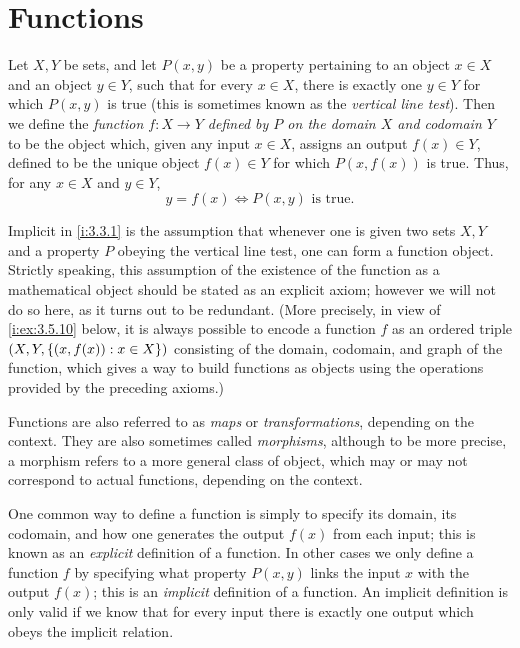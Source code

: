 \section{Functions}\label{i:sec:3.3}

\begin{defn}[Functions]\label{i:3.3.1}
  Let \(X, Y\) be sets, and let \(P(x, y)\) be a property pertaining to an object \(x \in X\) and an object \(y \in Y\), such that for every \(x \in X\), there is exactly one \(y \in Y\) for which \(P(x, y)\) is true (this is sometimes known as the \emph{vertical line test}).
  Then we define the \emph{function \(f : X \to Y\) defined by \(P\) on the domain \(X\) and codomain \(Y\)} to be the object which, given any input \(x \in X\), assigns an output \(f(x) \in Y\), defined to be the unique object \(f(x) \in Y\) for which \(P(x, f(x))\) is true.
  Thus, for any \(x \in X\) and \(y \in Y\),
  \[
    y = f(x) \iff P(x, y) \text{ is true}.
  \]
\end{defn}

\begin{note}
  Implicit in \cref{i:3.3.1} is the assumption that whenever one is given two sets \(X, Y\) and a property \(P\) obeying the vertical line test, one can form a function object.
  Strictly speaking, this assumption of the existence of the function as a mathematical object should be stated as an explicit axiom;
  however we will not do so here, as it turns out to be redundant.
  (More precisely, in view of \cref{i:ex:3.5.10} below, it is always possible to encode a function \(f\) as an ordered triple \((X, Y, \left\lbrace(x, f(x)) : x \in X\right\rbrace)\) consisting of the domain, codomain, and graph of the function, which gives a way to build functions as objects using the operations provided by the preceding axioms.)
\end{note}

\begin{note}
  Functions are also referred to as \emph{maps} or \emph{transformations}, depending on the context.
  They are also sometimes called \emph{morphisms}, although to be more precise, a morphism refers to a more general class of object, which may or may not correspond to actual functions, depending on the context.
\end{note}

\begin{note}
  One common way to define a function is simply to specify its domain, its codomain, and how one generates the output \(f(x)\) from each input;
  this is known as an \emph{explicit} definition of a function.
  In other cases we only define a function \(f\) by specifying what property \(P(x, y)\) links the input \(x\) with the output \(f(x)\);
  this is an \emph{implicit} definition of a function.
  An implicit definition is only valid if we know that for every input there is exactly one output which obeys the implicit relation.
\end{note}


